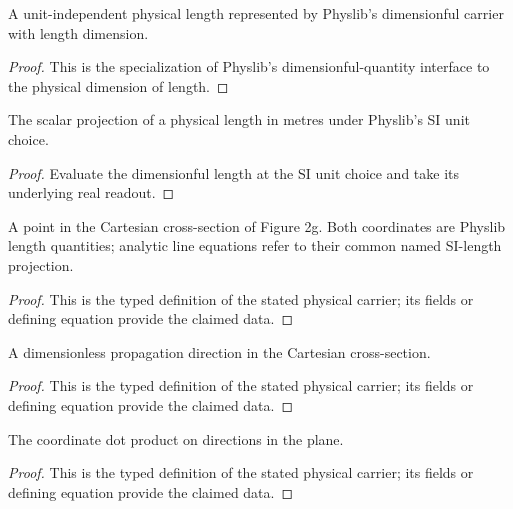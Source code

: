 \begin{definition}
  \label{def:physics:IPhO_2026_2_C_1:length_quantity}
  A unit-independent physical length represented by Physlib's dimensionful
  carrier with length dimension.
\end{definition}
\begin{proof}
  This is the specialization of Physlib's dimensionful-quantity interface to
  the physical dimension of length.
\end{proof}

\begin{definition}
  \label{def:physics:IPhO_2026_2_C_1:length_in_metres}
  The scalar projection of a physical length in metres under Physlib's SI
  unit choice.
\end{definition}
\begin{proof}
  Evaluate the dimensionful length at the SI unit choice and take its
  underlying real readout.
\end{proof}

\begin{definition}
  \label{def:physics:IPhO_2026_2_C_1:aux001}
  A point in the Cartesian cross-section of Figure 2g.  Both coordinates are
  Physlib length quantities; analytic line equations refer to their common
  named SI-length projection.
\end{definition}
\begin{proof}
  This is the typed definition of the stated physical carrier; its fields or defining equation provide the claimed data.
\end{proof}

\begin{definition}
  \label{def:physics:IPhO_2026_2_C_1:aux002}
  A dimensionless propagation direction in the Cartesian cross-section.
\end{definition}
\begin{proof}
  This is the typed definition of the stated physical carrier; its fields or defining equation provide the claimed data.
\end{proof}

\begin{definition}
  \label{def:physics:IPhO_2026_2_C_1:aux003}
  The coordinate dot product on directions in the plane.
\end{definition}
\begin{proof}
  This is the typed definition of the stated physical carrier; its fields or defining equation provide the claimed data.
\end{proof}

